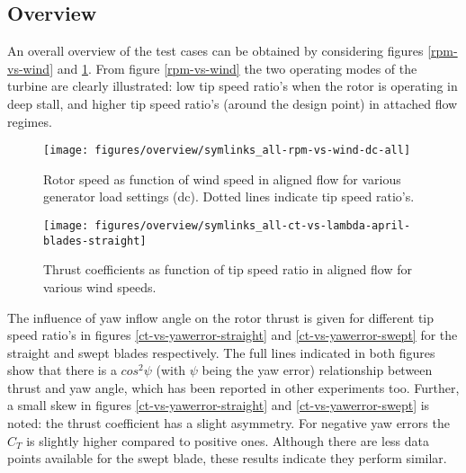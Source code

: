 \documentclass[a4paper]{jpconf}
\begin{document}
\subsection{Overview}

An overall overview of the test cases can be obtained by considering figures \ref{rpm-vs-wind} and \ref{ct-vs-lambda}. From figure \ref{rpm-vs-wind} the two operating modes of the turbine are clearly illustrated: low tip speed ratio's when the rotor is operating in deep stall, and higher tip speed ratio's (around the design point) in attached flow regimes. 

\begin{figure}[h]
\begin{minipage}{17pc}
\vspace{10px}
\texttt{[image: figures/overview/symlinks\_all-rpm-vs-wind-dc-all]}
\caption{\label{rpm-vs-wind} Rotor speed as function of wind speed in aligned flow for various generator load settings (dc). Dotted lines indicate tip speed ratio's.}
\end{minipage}\hspace{3pc}%
\begin{minipage}{17pc}
\texttt{[image: figures/overview/symlinks\_all-ct-vs-lambda-april-blades-straight]}
\caption{\label{ct-vs-lambda} Thrust coefficients as function of tip speed ratio in aligned flow for various wind speeds.}
\end{minipage} 
\end{figure}


The influence of yaw inflow angle on the rotor thrust is given for different tip speed ratio's in figures \ref{ct-vs-yawerror-straight} and \ref{ct-vs-yawerror-swept} for the straight and swept blades respectively. The full lines indicated in both figures show that there is a $cos^2 \psi$ (with $\psi$ being the yaw error) relationship between thrust and yaw angle, which has been reported in other experiments too. Further, a small skew in figures \ref{ct-vs-yawerror-straight} and \ref{ct-vs-yawerror-swept} is noted: the thrust coefficient has a slight asymmetry. For negative yaw errors the $C_T$ is slightly higher compared to positive ones. Although there are less data points available for the swept blade, these results indicate they perform similar.

\end{document}
